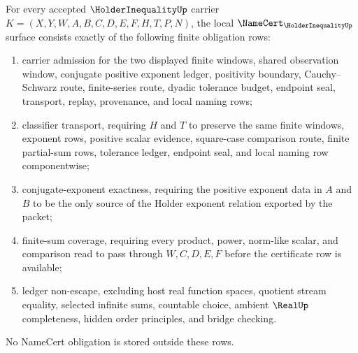 \begin{theorem}\label{thm:holder-inequality-namecert-obligations}
For every accepted $\HolderInequalityUp$ carrier $K=(X,Y,W,A,B,C,D,E,F,H,T,P,N)$, the local $\NameCert_{\HolderInequalityUp}$ surface consists exactly of the following finite obligation rows:
\begin{enumerate}
\item carrier admission for the two displayed finite windows, shared observation window, conjugate positive exponent ledger, positivity boundary, Cauchy--Schwarz route, finite-series route, dyadic tolerance budget, endpoint seal, transport, replay, provenance, and local naming rows;
\item classifier transport, requiring $H$ and $T$ to preserve the same finite windows, exponent rows, positive scalar evidence, square-case comparison route, finite partial-sum rows, tolerance ledger, endpoint seal, and local naming row componentwise;
\item conjugate-exponent exactness, requiring the positive exponent data in $A$ and $B$ to be the only source of the Holder exponent relation exported by the packet;
\item finite-sum coverage, requiring every product, power, norm-like scalar, and comparison read to pass through $W,C,D,E,F$ before the certificate row is available;
\item ledger non-escape, excluding host real function spaces, quotient stream equality, selected infinite sums, countable choice, ambient $\RealUp$ completeness, hidden order principles, and bridge checking.
\end{enumerate}
No NameCert obligation is stored outside these rows.
\end{theorem}
